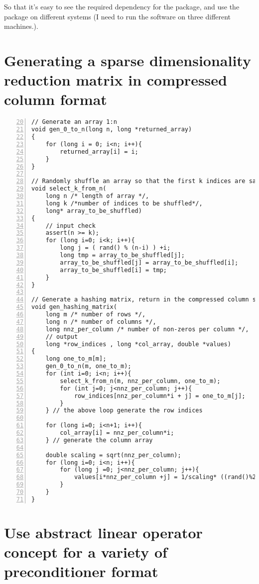 \documentclass[english,11pt]{article}
\begin{document}
So that it's easy to see the required dependency for the package, and use the package on different systems (I need to run the software on three different machines.). 


\section{Generating a sparse dimensionality reduction matrix in compressed column format}

\begin{lstlisting}[numbers=left, firstnumber=20]
// Generate an array 1:n
void gen_0_to_n(long n, long *returned_array)
{
    for (long i = 0; i<n; i++){
        returned_array[i] = i;
    }
}

// Randomly shuffle an array so that the first k indices are sampled from 1:n without replacement
void select_k_from_n(
    long n /* length of array */, 
    long k /*number of indices to be shuffled*/, 
    long* array_to_be_shuffled)
{
    // input check
    assert(n >= k);
    for (long i=0; i<k; i++){
        long j = ( rand() % (n-i) ) +i;
        long tmp = array_to_be_shuffled[j];
        array_to_be_shuffled[j] = array_to_be_shuffled[i];
        array_to_be_shuffled[i] = tmp;
    }
}

// Generate a hashing matrix, return in the compressed column sparse format
void gen_hashing_matrix(
    long m /* number of rows */, 
    long n /* number of columns */, 
    long nnz_per_column /* number of non-zeros per column */, 
    // output
    long *row_indices , long *col_array, double *values)
{
    long one_to_m[m];
    gen_0_to_n(m, one_to_m);
    for (int i=0; i<n; i++){
        select_k_from_n(m, nnz_per_column, one_to_m);
        for (int j=0; j<nnz_per_column; j++){
            row_indices[nnz_per_column*i + j] = one_to_m[j];
        }
    } // the above loop generate the row indices

    for (long i=0; i<n+1; i++){
        col_array[i] = nnz_per_column*i;
    } // generate the column array

    double scaling = sqrt(nnz_per_column);
    for (long i=0; i<n; i++){
        for (long j =0; j<nnz_per_column; j++){
            values[i*nnz_per_column +j] = 1/scaling* ((rand()%2)*2-1);
        }
    }
}
\end{lstlisting}


\section{Use abstract linear operator concept for a variety of preconditioner format}
\end{document}
